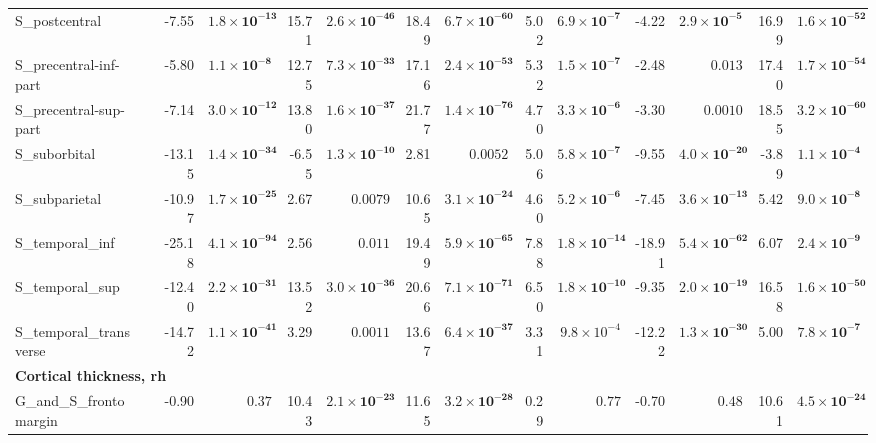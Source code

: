 {\begin{longtable}{llrrrrrrrrrrrr}
S\_postcentral &  & -7.55 & $\mathbf{1.8{\times}10^{-13}}$ & 15.71 & $\mathbf{2.6{\times}10^{-46}}$ & 18.49 & $\mathbf{6.7{\times}10^{-60}}$ & 5.02 & $\mathbf{6.9{\times}10^{-7}}$ & -4.22 & $\mathbf{2.9{\times}10^{-5}}$ & 16.99 & $\mathbf{1.6{\times}10^{-52}}$ \\
S\_precentral-inf-part &  & -5.80 & $\mathbf{1.1{\times}10^{-8}}$ & 12.75 & $\mathbf{7.3{\times}10^{-33}}$ & 17.16 & $\mathbf{2.4{\times}10^{-53}}$ & 5.32 & $\mathbf{1.5{\times}10^{-7}}$ & -2.48 & $0.013$ & 17.40 & $\mathbf{1.7{\times}10^{-54}}$ \\
S\_precentral-sup-part &  & -7.14 & $\mathbf{3.0{\times}10^{-12}}$ & 13.80 & $\mathbf{1.6{\times}10^{-37}}$ & 21.77 & $\mathbf{1.4{\times}10^{-76}}$ & 4.70 & $\mathbf{3.3{\times}10^{-6}}$ & -3.30 & $0.0010$ & 18.55 & $\mathbf{3.2{\times}10^{-60}}$ \\
S\_suborbital &  & -13.15 & $\mathbf{1.4{\times}10^{-34}}$ & -6.55 & $\mathbf{1.3{\times}10^{-10}}$ & 2.81 & $0.0052$ & 5.06 & $\mathbf{5.8{\times}10^{-7}}$ & -9.55 & $\mathbf{4.0{\times}10^{-20}}$ & -3.89 & $\mathbf{1.1{\times}10^{-4}}$ \\
S\_subparietal &  & -10.97 & $\mathbf{1.7{\times}10^{-25}}$ & 2.67 & $0.0079$ & 10.65 & $\mathbf{3.1{\times}10^{-24}}$ & 4.60 & $\mathbf{5.2{\times}10^{-6}}$ & -7.45 & $\mathbf{3.6{\times}10^{-13}}$ & 5.42 & $\mathbf{9.0{\times}10^{-8}}$ \\
S\_temporal\_inf &  & -25.18 & $\mathbf{4.1{\times}10^{-94}}$ & 2.56 & $0.011$ & 19.49 & $\mathbf{5.9{\times}10^{-65}}$ & 7.88 & $\mathbf{1.8{\times}10^{-14}}$ & -18.91 & $\mathbf{5.4{\times}10^{-62}}$ & 6.07 & $\mathbf{2.4{\times}10^{-9}}$ \\
S\_temporal\_sup &  & -12.40 & $\mathbf{2.2{\times}10^{-31}}$ & 13.52 & $\mathbf{3.0{\times}10^{-36}}$ & 20.66 & $\mathbf{7.1{\times}10^{-71}}$ & 6.50 & $\mathbf{1.8{\times}10^{-10}}$ & -9.35 & $\mathbf{2.0{\times}10^{-19}}$ & 16.58 & $\mathbf{1.6{\times}10^{-50}}$ \\
S\_temporal\_transverse &  & -14.72 & $\mathbf{1.1{\times}10^{-41}}$ & 3.29 & $0.0011$ & 13.67 & $\mathbf{6.4{\times}10^{-37}}$ & 3.31 & $9.8{\times}10^{-4}$ & -12.22 & $\mathbf{1.3{\times}10^{-30}}$ & 5.00 & $\mathbf{7.8{\times}10^{-7}}$ \\
\midrule\multicolumn{14}{l}{\textbf{Cortical thickness, rh}} \\
G\_and\_S\_frontomargin &  & -0.90 & $0.37$ & 10.43 & $\mathbf{2.1{\times}10^{-23}}$ & 11.65 & $\mathbf{3.2{\times}10^{-28}}$ & 0.29 & $0.77$ & -0.70 & $0.48$ & 10.61 & $\mathbf{4.5{\times}10^{-24}}$ \\

\end{longtable}}
